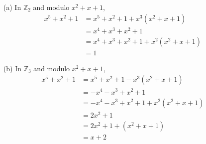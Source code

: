 \documentclass[11pt]{article}
\begin{document}
\newpage{}
\begin{itemize}
  \item[{(a)}] In $\mathbb{Z}_2$ and modulo $x^2 + x + 1$,
    \begin{align*}
         x^5 + x^2 + 1
      &= x^5 + x^2 + 1 + x^3(x^2+x+1)\\
      &= x^4 + x^3 + x^2 + 1\\
      &= x^4 + x^3 + x^2 + 1 + x^2(x^2+x+1)\\
      &= 1
    \end{align*}
  \item[{(b)}] In $\mathbb{Z}_3$ and modulo $x^2 + x + 1$,
    \begin{align*}
         x^5 + x^2 + 1
      &= x^5 + x^2 + 1 - x^3(x^2+x+1)\\
      &=-x^4 - x^3 + x^2 + 1\\
      &=-x^4 - x^3 + x^2 + 1 + x^2(x^2+x+1)\\
      &= 2x^2 + 1\\
      &= 2x^2 + 1 + (x^2 + x + 1)\\
      &= x + 2
    \end{align*}
\end{itemize}
\end{document}
